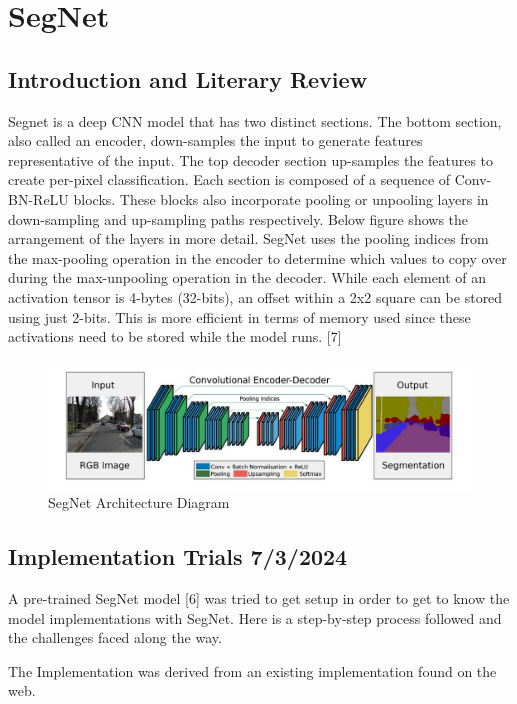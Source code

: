 \chapter{SegNet}
\section{Introduction and Literary Review}
Segnet is a deep CNN model that has two distinct sections. The bottom section, also called an encoder, down-samples the input to generate features representative of the input. The top decoder section up-samples the features to create per-pixel classification. Each section is composed of a sequence of Conv-BN-ReLU blocks. These blocks also incorporate pooling or unpooling layers in down-sampling and up-sampling paths respectively. Below figure shows the arrangement of the layers in more detail. SegNet uses the pooling indices from the max-pooling operation in the encoder to determine which values to copy over during the max-unpooling operation in the decoder. While each element of an activation tensor is 4-bytes (32-bits), an offset within a 2x2 square can be stored using just 2-bits. This is more efficient in terms of memory used since these activations need to be stored while the model runs. [7]

\begin{figure}[H]
    \centering
    \includegraphics[width=450pt]{assets/segnet}
    \caption{SegNet Architecture Diagram}
    \label{fig:using:segnetarchi}
\end{figure}

\section{Implementation Trials 7/3/2024}
A pre-trained SegNet model [6] was tried to get setup in order to get to know the model implementations with SegNet. Here is a step-by-step process followed and the challenges faced along the way.

The Implementation was derived from an existing implementation found on the web.

